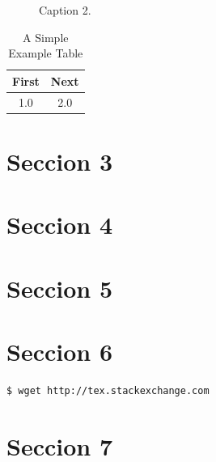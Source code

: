 \documentclass[
  letterpaper,
  twocolumn,
  9pt,
  journal,
  final]{IEEEtran}
\begin{document}
\begin{figure}[tbh!]
  \begin{center}
  \end{center}
  \caption{Caption 2.} \label{fig:texto referenecia2}
\end{figure}

\lipsum[1]

\begin{table} \caption{A Simple Example Table} \label{table_example}
  \begin{center}
    \begin{tabular}{c c}
      \hline
      \bfseries First & \bfseries Next\\ \hline\hline
      1.0 & 2.0 \\
      \hline
    \end{tabular}
  \end{center}
\end{table}


\section{Seccion 3}


\lipsum[1]

\section{Seccion 4}
\lipsum[1]

\section{Seccion 5}
\lipsum[1]

\section{Seccion 6}

\begin{lstlisting}[language=bash]
  $ wget http://tex.stackexchange.com
\end{lstlisting}


\lipsum[1]

\section{Seccion 7}
\lipsum[1]


\nocite{*}


\end{document}
